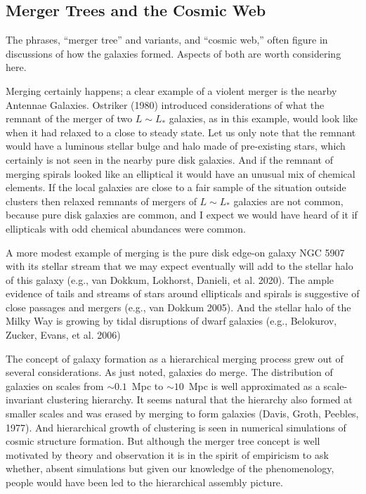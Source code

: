 \documentclass[fleqn,usenatbib]{mnras}
\begin{document}
\subsection{Merger Trees and the Cosmic Web}

The phrases, ``merger tree'' and variants, and ``cosmic web,'' often figure in discussions of how the galaxies formed. Aspects of both are worth considering here. 

Merging certainly happens; a clear example of a violent merger is the nearby Antennae Galaxies. Ostriker (1980) introduced considerations of what the remnant of the merger of two $L\sim L_\ast$ galaxies, as in this example, would look like when it had relaxed to a close to steady state. Let us only note that the remnant would have a luminous stellar bulge and halo made of pre-existing stars, which certainly is not seen in the nearby pure disk galaxies. And if the remnant of merging spirals looked like an elliptical it would have an unusual mix of chemical elements. If the local galaxies are close to a fair sample of the situation outside clusters then relaxed remnants of mergers of $L\sim L_\ast$ galaxies are not common, because pure disk galaxies are common, and I expect we would have heard of it if ellipticals with odd chemical abundances were common. 

A more modest example of merging is the pure disk edge-on galaxy NGC 5907 with its stellar stream that we may expect  eventually will add to the stellar halo of this galaxy (e.g., van Dokkum, Lokhorst, Danieli, et al. 2020). The ample evidence of tails and streams of stars around ellipticals and spirals is suggestive of close passages and mergers (e.g., van Dokkum 2005). And the stellar halo of the Milky Way is growing by tidal disruptions of dwarf galaxies (e.g., Belokurov, Zucker, Evans, et al. 2006)

The concept of galaxy formation as a hierarchical merging process grew out of several considerations. As just noted, galaxies do merge. The distribution of galaxies on scales from $\sim 0.1$~Mpc to $\sim 10$~Mpc is well approximated as a scale-invariant clustering hierarchy. It seems natural that the hierarchy also formed at smaller scales and was erased by merging to form galaxies (Davis, Groth, Peebles, 1977). And hierarchical growth of clustering is seen in numerical simulations of cosmic structure formation. But although the merger tree concept is well motivated by theory and observation it is in the spirit of empiricism to ask whether, absent simulations but given our knowledge of the phenomenology, people would have been led to the hierarchical assembly picture. 
\end{document}
